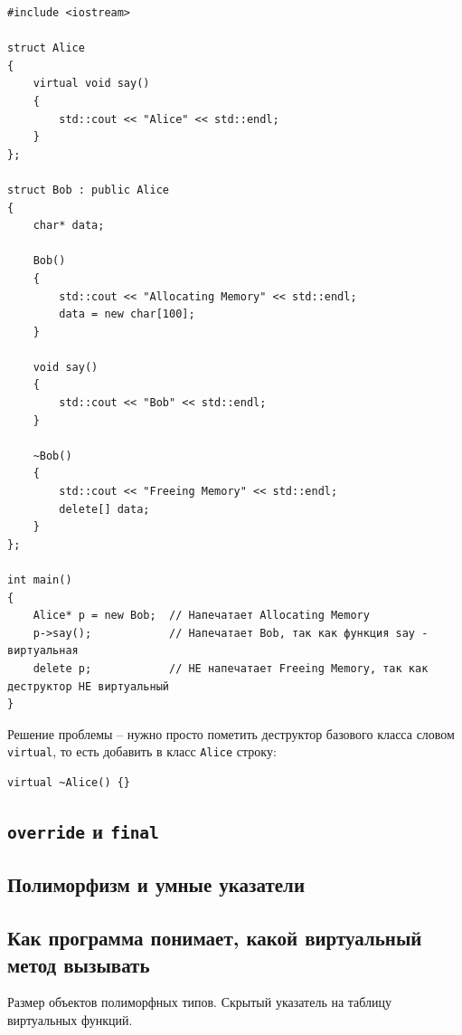 \documentclass{article}
\begin{document}
\begin{lstlisting}[style=csMiptCppBorderStyle]
#include <iostream>

struct Alice 
{
    virtual void say() 
    {
    	std::cout << "Alice" << std::endl;
    }
};

struct Bob : public Alice 
{
	char* data;
	
	Bob()
	{
		std::cout << "Allocating Memory" << std::endl;
		data = new char[100];		
	}
	
    void say() 
    {
    	std::cout << "Bob" << std::endl;
    }
    
    ~Bob()
    {
    	std::cout << "Freeing Memory" << std::endl;
    	delete[] data;
    }
};

int main() 
{
	Alice* p = new Bob;  // Напечатает Allocating Memory
    p->say();            // Напечатает Bob, так как функция say - виртуальная
    delete p;            // НЕ напечатает Freeing Memory, так как деструктор НЕ виртуальный
}
\end{lstlisting}

Решение проблемы -- нужно просто пометить деструктор базового класса словом \texttt{virtual}, то есть добавить в класс \texttt{Alice} строку:
\begin{lstlisting}[style=csMiptCppStyle]
virtual ~Alice() {}
\end{lstlisting}

\subsection*{\texttt{override} и \texttt{final}}

\subsection*{Полиморфизм и умные указатели}

\subsection*{Как программа понимает, какой виртуальный метод вызывать}
Размер объектов полиморфных типов. Скрытый указатель на таблицу виртуальных функций.




\newpage
\end{document}
